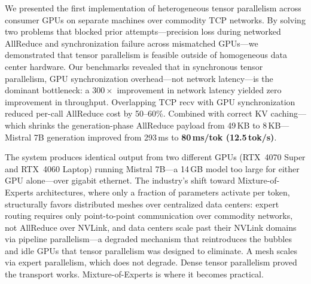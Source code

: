 \documentclass[10pt,twocolumn]{article}
\begin{document}
We presented the first implementation of heterogeneous tensor parallelism
across consumer GPUs on separate machines over commodity TCP networks.  By
solving two problems that blocked prior attempts---precision loss during
networked AllReduce and synchronization failure across mismatched
GPUs---we demonstrated that tensor parallelism is feasible outside of
homogeneous data center hardware.  Our benchmarks revealed that in
synchronous tensor parallelism, GPU synchronization overhead---not network
latency---is the dominant bottleneck: a $300\times$ improvement in network
latency yielded zero improvement in throughput.  Overlapping TCP recv with
GPU synchronization reduced per-call AllReduce cost by 50--60\%.  Combined
with correct KV caching---which shrinks the generation-phase AllReduce
payload from 49\,KB to 8\,KB---Mistral 7B generation improved from
293\,ms to \textbf{80\,ms/tok (12.5\,tok/s)}.

The system produces identical output from two different GPUs (RTX~4070
Super and RTX~4060 Laptop) running Mistral 7B---a 14\,GB model too large
for either GPU alone---over gigabit ethernet.  The industry's shift toward
Mixture-of-Experts architectures, where only a fraction of parameters
activate per token, structurally favors distributed meshes over centralized
data centers: expert routing requires only point-to-point communication
over commodity networks, not AllReduce over NVLink, and data centers scale
past their NVLink domains via pipeline parallelism---a degraded mechanism
that reintroduces the bubbles and idle GPUs that tensor parallelism was
designed to eliminate.  A mesh scales via expert parallelism, which does
not degrade.  Dense tensor parallelism proved the transport works.
Mixture-of-Experts is where it becomes practical.


\end{document}
